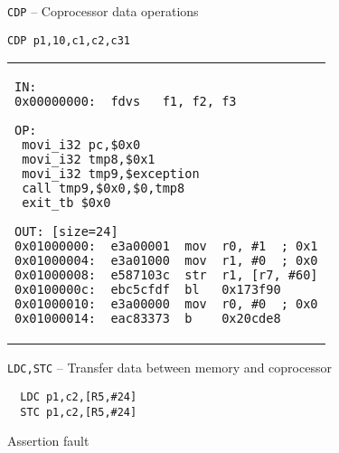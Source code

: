 \documentclass{report}
\begin{document}
\newpage
{\tt CDP} -- Coprocessor data operations\\
\begin{lstlisting}
CDP p1,10,c1,c2,c31
\end{lstlisting}
\begin{tabular}{l}
\hline\noalign{\smallskip}
\begin{lstlisting}
IN: 
0x00000000:  fdvs	f1, f2, f3

OP:
 movi_i32 pc,$0x0
 movi_i32 tmp8,$0x1
 movi_i32 tmp9,$exception
 call tmp9,$0x0,$0,tmp8
 exit_tb $0x0

OUT: [size=24]
0x01000000:  e3a00001  mov	r0, #1	; 0x1
0x01000004:  e3a01000  mov	r1, #0	; 0x0
0x01000008:  e587103c  str	r1, [r7, #60]
0x0100000c:  ebc5cfdf  bl	0x173f90
0x01000010:  e3a00000  mov	r0, #0	; 0x0
0x01000014:  eac83373  b	0x20cde8
\end{lstlisting}
\end{tabular}

\newpage
{\tt LDC,STC} -- Transfer data between memory and coprocessor\\
\begin{lstlisting}
  LDC p1,c2,[R5,#24]
  STC p1,c2,[R5,#24]
\end{lstlisting}
Assertion fault
\end{document}
